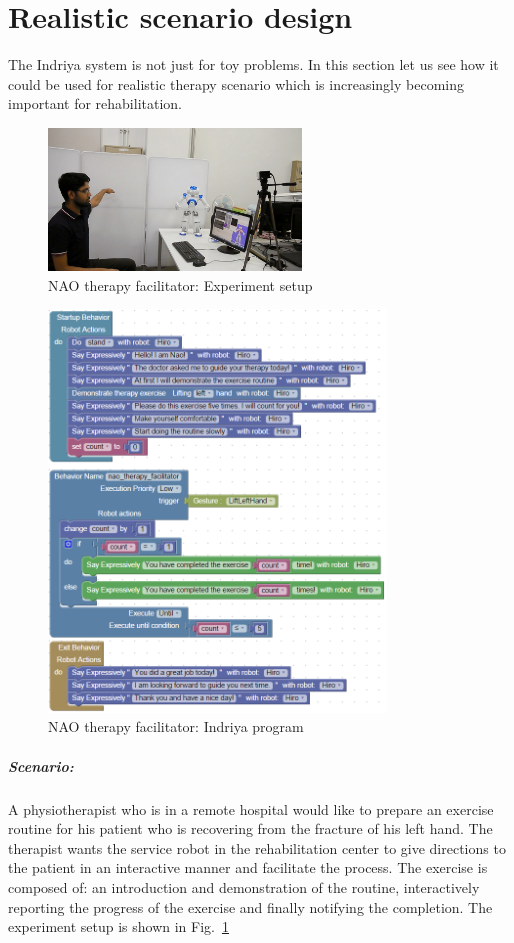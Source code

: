 \section{Realistic scenario design}
The Indriya system is not just for toy problems. In this section let us see how it could be used for realistic therapy scenario which is increasingly becoming important for rehabilitation. 
\begin{figure}[H]
\centering
\includegraphics[width=0.6\textwidth]{../thesis/assets/scenario_therapy.png}
\caption[NAO therapy facilitator: Experiment setup]{NAO therapy facilitator: Experiment setup}
\label{fig:scenario2_setup}
\end{figure}
\begin{figure}[H]
\centering
\includegraphics[width=0.8\textwidth]{../thesis/assets/scenario2_new.png}
\caption[NAO therapy facilitator: Indriya program]{NAO therapy facilitator: Indriya program}
\label{fig:scenario2_program}
\end{figure}
\subparagraph{Scenario:}A physiotherapist who is in a remote hospital would like to prepare an exercise routine for his patient who is recovering from the fracture of his left hand. The therapist wants the service robot in the rehabilitation center to give directions to the patient in an interactive manner and facilitate the process. The exercise is composed of: an introduction and demonstration of the routine, interactively reporting the progress of the exercise and finally notifying the completion. The experiment setup is shown in Fig.~\ref{fig:scenario2_setup}

